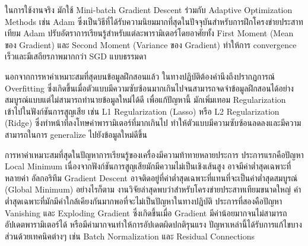 ในการใช้งานจริง มักใช้ Mini-batch Gradient Descent ร่วมกับ Adaptive Optimization Methods เช่น Adam ซึ่งเป็นวิธีที่ได้รับความนิยมมากที่สุดในปัจจุบันสำหรับการฝึกโครงข่ายประสาทเทียม Adam ปรับอัตราการเรียนรู้สำหรับแต่ละพารามิเตอร์โดยอาศัยทั้ง First Moment (Mean ของ Gradient) และ Second Moment (Variance ของ Gradient) ทำให้การ convergence เร็วและมีเสถียรภาพมากกว่า SGD แบบธรรมดา

นอกจากการหาค่าเหมาะสมที่สุดบนข้อมูลฝึกสอนแล้ว ในทางปฏิบัติต้องคำนึงถึงปรากฏการณ์ Overfitting ซึ่งเกิดขึ้นเมื่อตัวแบบมีความซับซ้อนมากเกินไปจนสามารถจดจำข้อมูลฝึกสอนได้อย่างสมบูรณ์แบบแต่ไม่สามารถทำนายข้อมูลใหม่ได้ดี เพื่อแก้ปัญหานี้ มักเพิ่มเทอม Regularization เข้าไปในฟังก์ชันการสูญเสีย เช่น L1 Regularization (Lasso) หรือ L2 Regularization (Ridge) ซึ่งทำหน้าที่ลงโทษค่าพารามิเตอร์ที่มากเกินไป ทำให้ตัวแบบมีความซับซ้อนลดลงและมีความสามารถในการ generalize ไปยังข้อมูลใหม่ดีขึ้น

การหาค่าเหมาะสมที่สุดในปัญหาการเรียนรู้ของเครื่องมีความท้าทายหลายประการ ประการแรกคือปัญหา Local Minimum เนื่องจากฟังก์ชันการสูญเสียมักมีความไม่เป็นเชิงเส้นสูง อาจมีค่าต่ำสุดเฉพาะที่หลายค่า อัลกอริทึม Gradient Descent อาจติดอยู่ที่ค่าต่ำสุดเฉพาะที่แทนที่จะเป็นค่าต่ำสุดสมบูรณ์ (Global Minimum) อย่างไรก็ตาม งานวิจัยล่าสุดพบว่าสำหรับโครงข่ายประสาทเทียมขนาดใหญ่ ค่าต่ำสุดเฉพาะที่มักมีค่าใกล้เคียงกันมากพอที่จะไม่เป็นปัญหาในทางปฏิบัติ ประการที่สองคือปัญหา Vanishing และ Exploding Gradient ซึ่งเกิดขึ้นเมื่อ Gradient มีค่าน้อยมากจนไม่สามารถอัปเดตพารามิเตอร์ได้ หรือมีค่ามากจนทำให้การอัปเดตผิดปกติรุนแรง ปัญหาเหล่านี้ได้รับการแก้ไขบางส่วนด้วยเทคนิคต่างๆ เช่น Batch Normalization และ Residual Connections

\newpage
